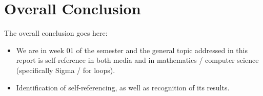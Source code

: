 \documentclass[12pt]{article}
\begin{document}

\newpage

\section{Overall Conclusion}

The overall conclusion goes here:

\begin{itemize}

\item
  We are in week 01 of the semester and the general topic addressed in this report is self-reference in both media and in mathematics / computer science (specifically Sigma / for loops).

\item
  Identification of self-referencing, as well as recognition of its results.

\end{itemize}

\end{document}
